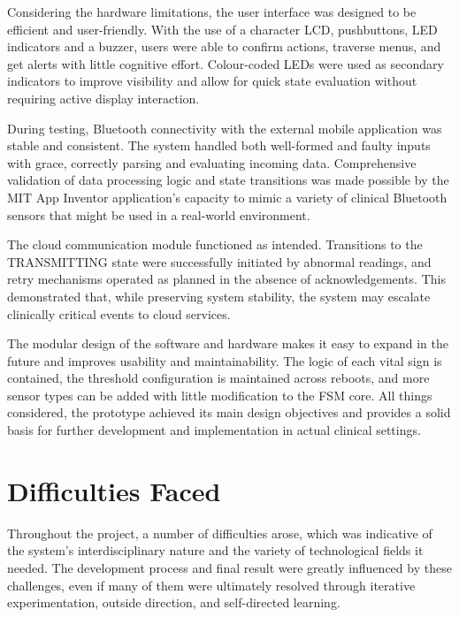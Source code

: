 Considering the hardware limitations, the user interface was designed to be efficient and user-friendly. With the use of a character LCD, pushbuttons, LED indicators and a buzzer, users were able to confirm actions, traverse menus, and get alerts with little cognitive effort. Colour-coded LEDs were used as secondary indicators to improve visibility and allow for quick state evaluation without requiring active display interaction.

During testing, Bluetooth connectivity with the external mobile application was stable and consistent. The system handled both well-formed and faulty inputs with grace, correctly parsing and evaluating incoming data. Comprehensive validation of data processing logic and state transitions was made possible by the MIT App Inventor application's capacity to mimic a variety of clinical Bluetooth sensors that might be used in a real-world environment.

The cloud communication module functioned as intended. Transitions to the TRANSMITTING state were successfully initiated by abnormal readings, and retry mechanisms operated as planned in the absence of acknowledgements. This demonstrated that, while preserving system stability, the system may escalate clinically critical events to cloud services.

The modular design of the software and hardware makes it easy to expand in the future and improves usability and maintainability. The logic of each vital sign is contained, the threshold configuration is maintained across reboots, and more sensor types can be added with little modification to the FSM core. All things considered, the prototype achieved its main design objectives and provides a solid basis for further development and implementation in actual clinical settings.

\section{Difficulties Faced}
Throughout the project, a number of difficulties arose, which was indicative of the system's interdisciplinary nature and the variety of technological fields it needed. The development process and final result were greatly influenced by these challenges, even if many of them were ultimately resolved through iterative experimentation, outside direction, and self-directed learning.

